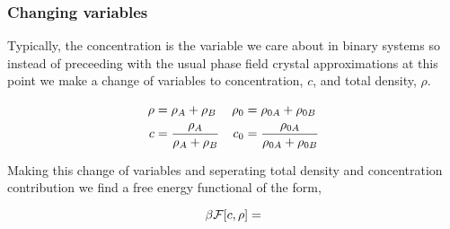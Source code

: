 \subsubsection{Changing variables} Typically, the concentration is the variable
we care about in binary systems so instead of preceeding with the usual phase
field crystal approximations at this point we make a change of variables to
concentration, $c$, and total density, $\rho$.

\begin{align} \rho &= \rho_A + \rho_B             & \rho_0 &= \rho_{0A} +
\rho_{0B} \nonumber \\ c &= \frac{\rho_A}{\rho_A + \rho_B}    &  c_0 &=
\frac{\rho_{0A}}{\rho_{0A} + \rho_{0B}} \nonumber \end{align}

Making this change of variables and seperating total density and concentration
contribution we find a free energy functional of the form,

\begin{equation} \beta\mathcal{F}[c, \rho] = \end{equation}
